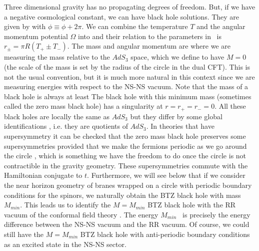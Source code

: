 Three dimensional gravity has no propagating degrees of freedom.
But, if we have a negative cosmological constant, we can have
black hole solutions. 
They are given by \cite{Banados:1992wn,Banados:1993gq}
with $\phi \equiv \phi + 2 \pi $. 
We can combine the temperature $T$ and the angular momentum potential
$\Omega$ into 
and their relation to the parameters in \lorbtz\ is 
$ r_\pm = \pi R ( T_+ \pm T_-)$. 
The mass and angular momentum are
where we are measuring the mass relative to the 
$AdS_3$ space, which we define to have $M=0$ (the scale of the mass is
set by the radius of the circle in the dual CFT). 
This is not the usual convention, but it is much more
natural in this context since we are measuring energies with 
respect to the NS-NS vacuum.  
 Note that the mass of a black hole is always 
at least
The black hole with this minimum mass (sometimes called the zero mass
black hole) has a singularity at $r= r_+ = r_- =0$. 
All these black holes are locally the same as $AdS_3$ but they differ
by some global identifications \cite{Banados:1992wn,Banados:1993gq},
 i.e. they are quotients of 
$AdS_3$. 
In theories that have supersymmetry it can be checked that the 
zero mass black hole preserves some supersymmetries provided that
we make the fermions periodic as we go around the circle 
\cite{Coussaert:1994jp}, which 
is  something we have the freedom to do once the circle 
is not contractible in the gravity geometry.
These 
supersymmetries commute with the Hamiltonian conjugate to $t$. 
Furthermore, we will see below that if we consider the near horizon
geometry of branes wrapped
on a circle with periodic boundary conditions for the spinors, 
 we naturally obtain the BTZ black hole with 
mass $M_{min}$. This leads us to identify the $M = M_{min}$ 
BTZ black hole with the RR vacuum of the conformal field theory
\cite{Coussaert:1994jp}. 
The energy $M_{min}$ \massmin\  is precisely the energy difference
between the NS-NS vacuum and the RR vacuum. 
Of course, we could still have the $M=M_{min}$ BTZ black hole with
anti-periodic boundary conditions as
an excited state  in the 
NS-NS sector. 

